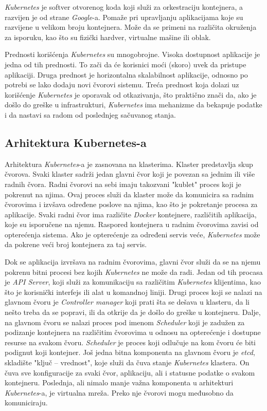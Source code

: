 \textit{Kubernetes} je softver otvorenog koda koji služi za orkestraciju kontejnera, a razvijen je od 
strane \textit{Google}-a. Pomaže pri upravljanju aplikacijama koje su razvijene u velikom broju 
kontejnera. Može da se primeni na različita okruženja za isporuku, kao što su fizički 
hardver, virtualne mašine ili oblak.

Prednosti korišćenja \textit{Kubernetes} su mnogobrojne. Visoka dostupnost aplikacije je jedna od tih prednosti. 
To zači da će korisnici moći (skoro) uvek da pristupe aplikaciji. Druga prednost je horizontalna 
skalabilnost aplikacije, odnosno po potrebi se lako dodaju novi čvorovi sistemu. Treća prednost koja 
dolazi uz korišćenje \textit{Kubernetes} je oporavak od otkazivanja, što praktično znači da, ako je došlo do 
greške u infrastrukturi, \textit{Kubernetes} ima mehanizme da bekapuje podatke i da nastavi sa radom od 
poslednjeg sačuvanog stanja.

\subsection{Arhitektura Kubernetes-a}
Arhitektura \textit{Kubernetes}-a je zasnovana na klasterima. Klaster predstavlja skup čvorova. Svaki klaster sadrži
jedan glavni čvor koji je povezan sa jednim ili više radnih čvora. Radni čvorovi na sebi imaju 
takozvani "kublet" proces koji je pokrenut na njima. Ovaj proces služi da klaster može da komunicira
sa radnim čvorovima i izvšava određene poslove na njima, kao što je pokretanje procesa za aplikacije.
Svaki radni čvor ima različite \textit{Docker} kontejnere, različitih aplikacija, koje su isporučene na njemu.
Raspored kontejnera u radnim čvorovima zavisi od opterećenja sistema. Ako je opterećenje za određeni 
servis veće, \textit{Kubernetes} može da pokrene veći broj kontejnera za taj servis. 

Dok se aplikacija izvršava na radnim čvorovima, glavni čvor služi da se na njemu pokrenu bitni procesi 
bez kojih \textit{Kubernetes} ne može da radi. Jedan od tih procasa je {\em API Server}, koji služi za 
komunikaciju sa različitim \textit{Kubernetes} klijentima, kao što je korisnički interfejs ili alat u 
komandnoj liniji. Drugi proces koji se nalazi na glavnom čvoru je {\em Controller manager} koji 
prati šta se dešava u klasteru, da li nešto treba da se popravi, ili da otkrije da je došlo do greške 
u kontejneru. Dalje, na glavnom čvoru se nalazi proces pod imenom {\em Scheduler} koji je zadužen 
za podizanje kontejnera na različitim čvorovima u odnosu na opterećenje i dostupne resurse na svakom 
čvoru. \textit{Scheduler} je proces koji odlučuje na kom čvoru će biti podignut koji kontejner. 
Još jedna bitna komponenta na glavnom čvoru je {\em etcd}, skladište "ključ -- vrednost", koje služi 
da čuva stanje \textit{Kubernetes} klastera. On čuva sve konfiguracije za svaki čvor, aplikaciju, ali i statusne 
podatke o svakom kontejneru. Poslednja, ali nimalo manje važna komponenta u arhitekturi \textit{Kubernetes}-a, 
je virtualna mreža. Preko nje čvorovi mogu međusobno da komuniciraju. 

